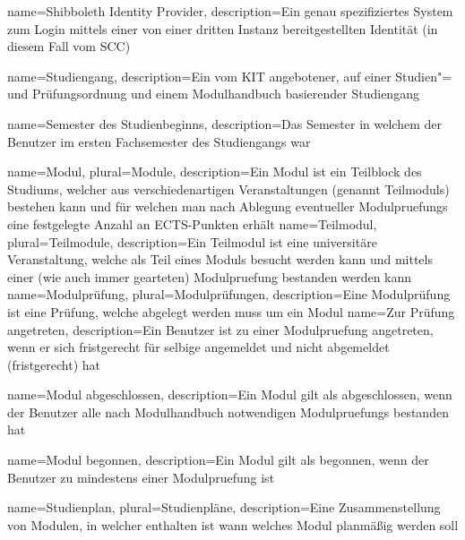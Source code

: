 {
	name=Shibboleth Identity Provider,
	description={Ein genau spezifiziertes System zum Login mittels einer von einer dritten Instanz bereitgestellten Identität (in diesem Fall vom \gls{SCC})}
}

{
	name=Studiengang,
	description={Ein vom KIT angebotener, auf einer Studien"= und Prüfungsordnung und einem Modulhandbuch basierender Studiengang}
}

{
	name=Semester des Studienbeginns,
	description={Das Semester in welchem der \gls{Benutzer} im ersten Fachsemester des \gls{Studiengang}s war}
}

{
	name=Modul,
	plural=Module,
	description={Ein Modul ist ein Teilblock des Studiums, welcher aus verschiedenartigen Veranstaltungen (genannt \glspl{Teilmodul}) bestehen kann und für welchen man nach Ablegung eventueller \glspl{Modulpruefung} eine festgelegte Anzahl an ECTS-Punkten erhält}
}
{
	name=Teilmodul,
	plural=Teilmodule,
	description={Ein Teilmodul ist eine universitäre Veranstaltung, welche als Teil eines Moduls besucht werden kann und mittels einer (wie auch immer gearteten) \gls{Modulpruefung} bestanden werden kann}
}
{
	name=Modulprüfung,
	plural=Modulprüfungen,
	description={Eine Modulprüfung ist eine Prüfung, welche abgelegt werden muss um ein Modul }
}
{
	name=Zur Prüfung angetreten,
	description={Ein \gls{Benutzer} ist zu einer \gls{Modulpruefung} angetreten, wenn er sich fristgerecht für selbige angemeldet und nicht abgemeldet (fristgerecht) hat}
}

{
	name=Modul abgeschlossen,
	description={Ein \gls{Modul} gilt als abgeschlossen, wenn der \gls{Benutzer} alle nach Modulhandbuch notwendigen \glspl{Modulpruefung} bestanden hat}
}

{
	name=Modul begonnen,
	description={Ein \gls{Modul} gilt als begonnen, wenn der \gls{Benutzer} zu mindestens einer \gls{Modulpruefung}  ist}
}

{
	name=Studienplan,
	plural=Studienpläne,
	description={Eine Zusammenstellung von Modulen, in welcher enthalten ist wann welches Modul planmäßig  werden soll}
}






